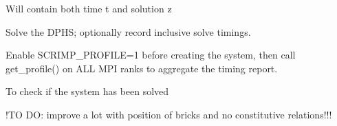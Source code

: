 \documentclass[letterpaper,10pt,english]{sphinxmanual}
\begin{document}
\begin{fulllineitems}
\begin{fulllineitems}
\end{fulllineitems}


\begin{fulllineitems}
\label{\detokenize{scrimp:scrimp.dphs.DPHS.solution}}
\pysigstartsignatures
\pysigline
{}
\pysigstopsignatures
\sphinxAtStartPar
Will contain both time t and solution z

\end{fulllineitems}


\begin{fulllineitems}
\label{\detokenize{scrimp:scrimp.dphs.DPHS.solve}}
\pysigstartsignatures
\pysiglinewithargsret
{}
{}
{}
\pysigstopsignatures
\sphinxAtStartPar
Solve the DPHS; optionally record inclusive solve timings.

\sphinxAtStartPar
Enable SCRIMP\_PROFILE=1 before creating the system, then call
get\_profile() on ALL MPI ranks to aggregate the timing report.

\end{fulllineitems}


\begin{fulllineitems}
\label{\detokenize{scrimp:scrimp.dphs.DPHS.solve_done}}
\pysigstartsignatures
\pysigline
{}
\pysigstopsignatures
\sphinxAtStartPar
To check if the system has been solved

\end{fulllineitems}


\begin{fulllineitems}
\label{\detokenize{scrimp:scrimp.dphs.DPHS.spy_Dirac}}
\pysigstartsignatures
\pysiglinewithargsret
{}
{\sphinxparamcomma {}}
{}
\pysigstopsignatures
\sphinxAtStartPar
!TO DO: improve a lot with position of bricks and no constitutive relations!!!


\end{fulllineitems}
\end{fulllineitems}
\end{document}
